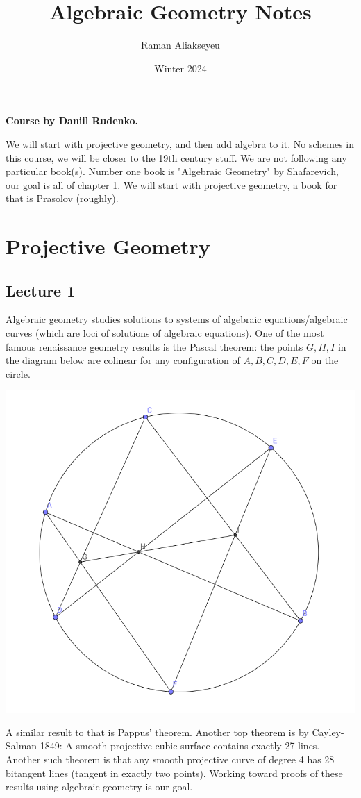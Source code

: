 \documentclass[12pt]{article}
\title{Algebraic Geometry Notes}
\author{Raman Aliakseyeu}
\date{Winter 2024}
\begin{document}
    \maketitle
    \noindent \textbf{Course by Daniil Rudenko.} \par
    We will start with projective geometry, and then add algebra to it. No schemes in this course, we will be closer to the 19th century stuff. We are not following any particular book(s). Number one book is "Algebraic Geometry" by Shafarevich, our goal is all of chapter 1. We will start with projective geometry, a book for that is Prasolov (roughly).
    \section{Projective Geometry}
    \subsection{Lecture 1}
        Algebraic geometry studies solutions to systems of algebraic equations/algebraic curves (which are loci of solutions of algebraic equations). One of the most famous renaissance geometry results is the Pascal theorem: the points $G, H, I$ in the diagram below are colinear for any configuration of $A, B, C, D, E, F$ on the circle.
        \begin{center}
            \includegraphics[width = 0.5 \linewidth]{pascals-theorem.PNG}
        \end{center}
        A similar result to that is Pappus' theorem. Another top theorem is by Cayley-Salman 1849: A smooth projective cubic surface contains exactly 27 lines. Another such theorem is that any smooth projective curve of degree 4 has 28 bitangent lines (tangent in exactly two points). Working toward proofs of these results using algebraic geometry is our goal. \par
\end{document}
